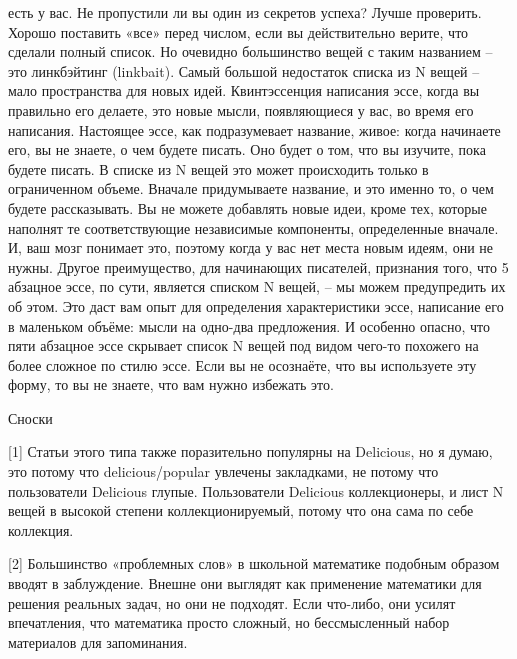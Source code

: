 \documentclass[ebook,12pt,oneside,openany]{memoir}
\begin{document}
есть у вас. Не пропустили ли вы один из секретов успеха? Лучше
проверить. Хорошо поставить «все» перед числом, если вы действительно
верите, что сделали полный список. Но очевидно большинство вещей с
таким названием – это линкбэйтинг (linkbait). Самый большой недостаток
списка из N вещей – мало пространства для новых идей. Квинтэссенция
написания эссе, когда вы правильно его делаете, это новые мысли,
появляющиеся у вас, во время его написания. Настоящее эссе, как
подразумевает название, живое: когда начинаете его, вы не знаете, о
чем будете писать. Оно будет о том, что вы изучите, пока будете
писать. В списке из N вещей это может происходить только в
ограниченном объеме. Вначале придумываете название, и это именно то, о
чем будете рассказывать. Вы не можете добавлять новые идеи, кроме тех,
которые наполнят те соответствующие независимые компоненты,
определенные вначале. И, ваш мозг понимает это, поэтому когда у вас
нет места новым идеям, они не нужны. Другое преимущество, для
начинающих писателей, признания того, что 5 абзацное эссе, по сути,
является списком N вещей, – мы можем предупредить их об этом. Это даст
вам опыт для определения характеристики эссе, написание его в
маленьком объёме: мысли на одно-два предложения. И особенно опасно,
что пяти абзацное эссе скрывает список N вещей под видом чего-то
похожего на более сложное по стилю эссе. Если вы не осознаёте, что вы
используете эту форму, то вы не знаете, что вам нужно избежать это.


Сноски

[1] Статьи этого типа также поразительно популярны на Delicious, но я
думаю, это потому что delicious/popular увлечены закладками, не потому
что пользователи Delicious глупые. Пользователи Delicious
коллекционеры, и лист N вещей в высокой степени коллекционируемый,
потому что она сама по себе коллекция.

[2] Большинство «проблемных слов» в школьной математике подобным
образом вводят в заблуждение. Внешне они выглядят как применение
математики для решения реальных задач, но они не подходят. Если
что-либо, они усилят впечатления, что математика просто сложный, но
бессмысленный набор материалов для запоминания.
\end{document}
